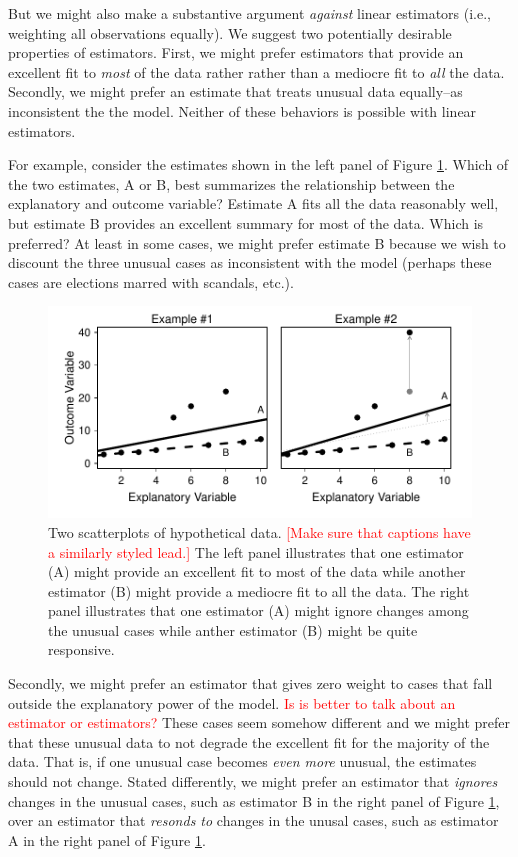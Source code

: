 \documentclass[12pt]{article}
\newcommand{\ctk}[1]{\textcolor{red}{#1}}
\begin{document}
But we might also make a substantive argument \textit{against} linear estimators (i.e., weighting all observations equally). 
We suggest two potentially desirable properties of estimators. 
First, we might prefer estimators that provide an excellent fit to \textit{most} of the data rather rather than a mediocre fit to \textit{all} the data. 
Secondly, we might prefer an estimate that treats unusual data equally--as inconsistent the the model.
Neither of these behaviors is possible with linear estimators.

For example, consider the estimates shown in the left panel of Figure \ref{fig:best-fit-illustration}. 
Which of the two estimates, A or B, best summarizes the relationship between the explanatory and outcome variable? 
Estimate A fits all the data reasonably well, but estimate B provides an excellent summary for most of the data. 
Which is preferred? 
At least in some cases, we might prefer estimate B because we wish to discount the three unusual cases as inconsistent with the model (perhaps these cases are elections marred with scandals, etc.).

\begin{figure}[h!]
\begin{center}
\includegraphics[scale = .7]{figs/best-fit-illustration.pdf}
\caption{Two scatterplots of hypothetical data. \ctk{[Make sure that captions have a similarly styled lead.]} 
The left panel illustrates that one estimator (A) might provide an excellent fit to most of the data while another estimator (B) might provide a mediocre fit to all the data. 
The right panel illustrates that one estimator (A) might ignore changes among the unusual cases while anther estimator (B) might be quite responsive.}\label{fig:best-fit-illustration}
\end{center}
\end{figure}

Secondly, we might prefer an estimator that gives zero weight to cases that fall outside the explanatory power of the model. \ctk{Is is better to talk about an estimator or estimators?}
These cases seem somehow different and we might prefer that these unusual data to not degrade the excellent fit for the majority of the data. 
That is, if one unusual case becomes \textit{even more} unusual, the estimates should not change. 
Stated differently, we might prefer an estimator that \textit{ignores} changes in the unusual cases, such as estimator B in the right panel of Figure \ref{fig:best-fit-illustration}, over an estimator that \textit{resonds to} changes in the unusal cases, such as estimator A in the right panel of Figure \ref{fig:best-fit-illustration}.
\end{document}
